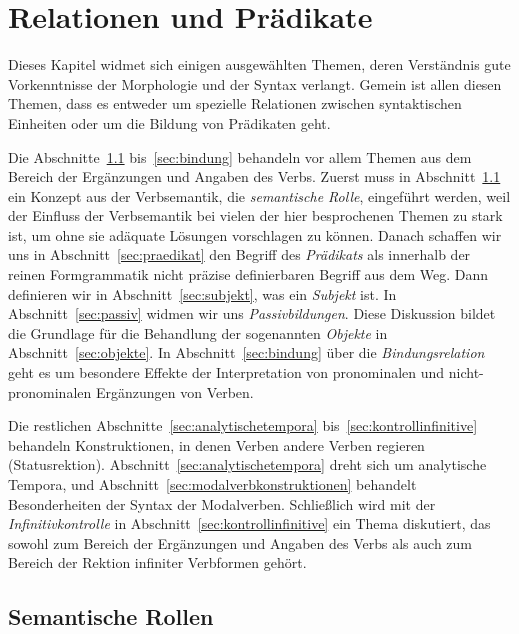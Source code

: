 \chapter{Relationen und Prädikate}

\label{sec:relationenpraedikate}

Dieses Kapitel widmet sich einigen ausgewählten Themen, deren Verständnis gute Vorkenntnisse der Morphologie und der Syntax verlangt.
Gemein ist allen diesen Themen, dass es entweder um spezielle Relationen zwischen syntaktischen Einheiten oder um die Bildung von Prädikaten geht.

Die Abschnitte~\ref{sec:semantischerollen} bis~\ref{sec:bindung} behandeln vor allem Themen aus dem Bereich der Ergänzungen und Angaben des Verbs.
Zuerst muss in Abschnitt~\ref{sec:semantischerollen} ein Konzept aus der Verbsemantik, die \textit{semantische Rolle}, eingeführt werden, weil der Einfluss der Verbsemantik bei vielen der hier besprochenen Themen zu stark ist, um ohne sie adäquate Lösungen vorschlagen zu können.
Danach schaffen wir uns in Abschnitt~\ref{sec:praedikat} den Begriff des \textit{Prädikats} als innerhalb der reinen Formgrammatik nicht präzise definierbaren Begriff aus dem Weg.
Dann definieren wir in Abschnitt~\ref{sec:subjekt}, was ein \textit{Subjekt} ist.
In Abschnitt~\ref{sec:passiv} widmen wir uns \textit{Passivbildungen}.
Diese Diskussion bildet die Grundlage für die Behandlung der sogenannten \textit{Objekte} in Abschnitt~\ref{sec:objekte}.
In Abschnitt~\ref{sec:bindung} über die \textit{Bindungsrelation} geht es um besondere Effekte der Interpretation von pronominalen und nicht-pronominalen Ergänzungen von Verben.

Die restlichen Abschnitte~\ref{sec:analytischetempora} bis~\ref{sec:kontrollinfinitive} behandeln Konstruktionen, in denen Verben andere Verben regieren (Statusrektion).
Abschnitt~\ref{sec:analytischetempora} dreht sich um analytische Tempora, und Abschnitt~\ref{sec:modalverbkonstruktionen} behandelt Besonderheiten der Syntax der Modalverben.
Schließlich wird mit der \textit{Infinitivkontrolle} in Abschnitt~\ref{sec:kontrollinfinitive} ein Thema diskutiert, das sowohl zum Bereich der Ergänzungen und Angaben des Verbs als auch zum Bereich der Rektion infiniter Verbformen gehört.

\section{Semantische Rollen}

\label{sec:semantischerollen}

